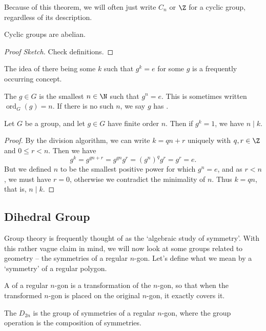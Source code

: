 \documentclass[a4paper]{scrartcl}
\newcommand{\newsection}{\subsection}
\begin{document}
Because of this theorem, we will often just write $C_n$ or $\Z$ for a cyclic group, regardless of its description.

\begin{proposition}
	Cyclic groups are abelian.
\end{proposition}
\begin{proof}[Proof Sketch]
	Check definitions.
\end{proof}

The idea of there being some $k$ such that $g^k = e$ for some $g$ is a frequently occurring concept.

\begin{definition}
	The  $g \in G$ is the smallest $n \in \N$ such that $g^n = e$. This is sometimes written $\operatorname{ord}_G(g) = n$. If there is no such $n$, we say $g$ has .
\end{definition}

\begin{theorem}
	Let $G$ be a group, and let $g \in G$ have finite order $n$. Then if $g^k = 1$, we have $n \mid k$.
\end{theorem}
\begin{proof}
	By the division algorithm, we can write $k = qn + r$ uniquely with $q, r \in \Z$ and $0 \leq r < n$. Then we have
	$$
	g^{k} = g^{qn + r} = g^{qn} g^r = (g^n)^q g^r = g^r = e.
	$$
	But we defined $n$ to be the smallest positive power for which $g^n = e$, and as $r < n$, we must have $r = 0$, otherwise we contradict the minimality of $n$. Thus $k = qn$, that is, $n \mid k$.
\end{proof}

\newsection{Dihedral Group}

Group theory is frequently thought of as the `algebraic study of symmetry'. With this rather vague claim in mind, we will now look at some groups related to geometry -- the symmetries of a regular $n$-gon. Let's define what we mean by a `symmetry' of a regular polygon.

\begin{definition}
	A  of a regular $n$-gon is a transformation of the $n$-gon, so that when the transformed $n$-gon is placed on the original $n$-gon, it exactly covers it.
\end{definition}

\begin{definition}
	The  $D_{2n}$ is the group of symmetries of a regular $n$-gon, where the group operation is the composition of symmetries.
\end{definition}
\end{document}

